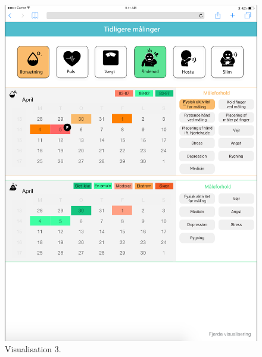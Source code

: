 \begin{figure}[h]
  \centering
  \begin{minipage}[b]{0.45\textwidth}
    \includegraphics[width=\textwidth]{images/study2/v3.png}
    \caption{Visualisation 3.}
    \label{fig:v3}
  \end{minipage}
  \hfill
  \begin{minipage}[b]{0.45\textwidth}

\end{minipage}
\end{figure}
